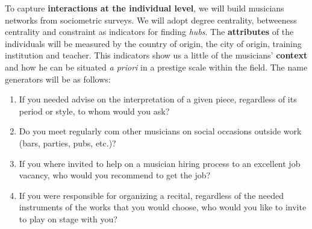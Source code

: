 \documentclass[a4paper, 12pt, openright, oneside, german, french, brazil, english]{abntex2}
\begin{document}
	
	To capture \textbf{interactions at the individual level}, we will build musicians networks from sociometric surveys. We will adopt degree centrality, betweeness centrality and constraint as indicators for finding \textit{hubs}. The \textbf{attributes} of the individuals will be measured by the country of origin, the city of origin, training institution and teacher. This indicators show us a little of the musicians' \textbf{context} and how he can be situated \textit{a priori} in a prestige scale within the field. The name generators will be as follows:

        \begin{enumerate}
        \item If you needed advise on the interpretation of a given piece, regardless of its period or style, to whom would you ask?
        \item Do you meet regularly com other musicians on social occasions outside work (bars, parties, pubs, etc.)?
        \item If you where invited to help on a musician hiring process to an excellent job vacancy, who would you recommend to get the job?
        \item If you were responsible for organizing a recital, regardless of the needed instruments of the works that you would choose, who would you like to invite to play on stage with you?
        \end{enumerate}
	
	
\end{document}
